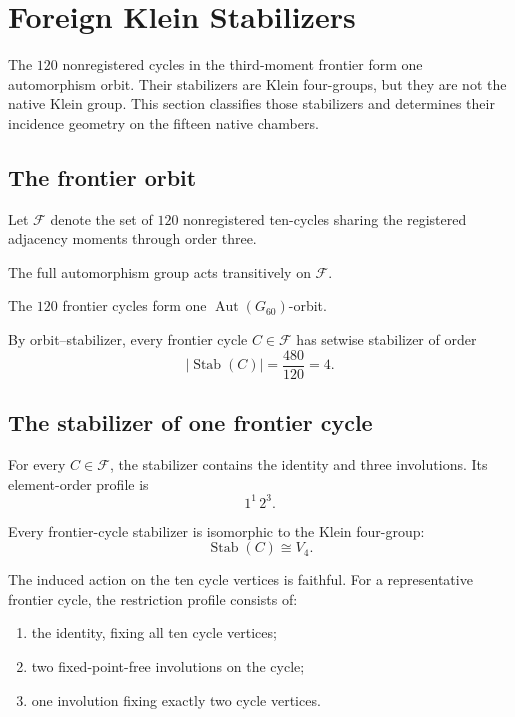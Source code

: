 \section{Foreign Klein Stabilizers}

The \(120\) nonregistered cycles in the third-moment frontier form one
automorphism orbit. Their stabilizers are Klein four-groups, but they
are not the native Klein group. This section classifies those
stabilizers and determines their incidence geometry on the fifteen
native chambers.

\subsection{The frontier orbit}

Let \(\mathcal F\) denote the set of \(120\) nonregistered ten-cycles
sharing the registered adjacency moments through order three.

The full automorphism group acts transitively on \(\mathcal F\).

\begin{theorem}
The \(120\) frontier cycles form one
\(\operatorname{Aut}(G_{60})\)-orbit.
\end{theorem}

By orbit--stabilizer, every frontier cycle \(C\in\mathcal F\) has
setwise stabilizer of order
\[
|\operatorname{Stab}(C)|
=
\frac{480}{120}
=
4.
\]

\subsection{The stabilizer of one frontier cycle}

For every \(C\in\mathcal F\), the stabilizer contains the identity and
three involutions. Its element-order profile is
\[
1^1\,2^3.
\]

\begin{theorem}
Every frontier-cycle stabilizer is isomorphic to the Klein four-group:
\[
\operatorname{Stab}(C)\cong V_4.
\]
\end{theorem}

The induced action on the ten cycle vertices is faithful. For a
representative frontier cycle, the restriction profile consists of:

\begin{enumerate}
    \item the identity, fixing all ten cycle vertices;
    \item two fixed-point-free involutions on the cycle;
    \item one involution fixing exactly two cycle vertices.
\end{enumerate}

